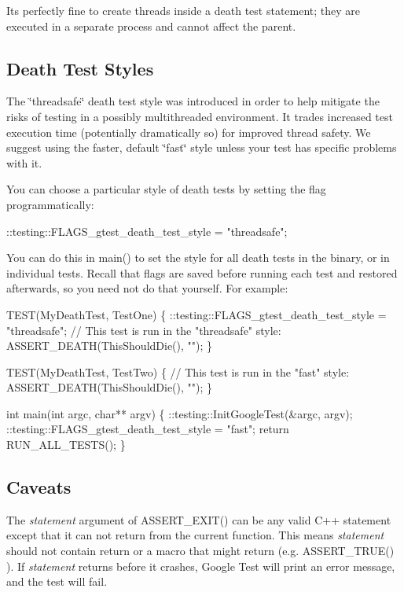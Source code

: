 It\textquotesingle{}s perfectly fine to create threads inside a death test statement; they are executed in a separate process and cannot affect the parent.

\subsection*{Death Test Styles}

The \char`\"{}threadsafe\char`\"{} death test style was introduced in order to help mitigate the risks of testing in a possibly multithreaded environment. It trades increased test execution time (potentially dramatically so) for improved thread safety. We suggest using the faster, default \char`\"{}fast\char`\"{} style unless your test has specific problems with it.

You can choose a particular style of death tests by setting the flag programmatically\+:


\begin{DoxyCode}
::testing::FLAGS\_gtest\_death\_test\_style = "threadsafe";
\end{DoxyCode}


You can do this in {\ttfamily main()} to set the style for all death tests in the binary, or in individual tests. Recall that flags are saved before running each test and restored afterwards, so you need not do that yourself. For example\+:


\begin{DoxyCode}
TEST(MyDeathTest, TestOne) \{
  ::testing::FLAGS\_gtest\_death\_test\_style = "threadsafe";
  // This test is run in the "threadsafe" style:
  ASSERT\_DEATH(ThisShouldDie(), "");
\}

TEST(MyDeathTest, TestTwo) \{
  // This test is run in the "fast" style:
  ASSERT\_DEATH(ThisShouldDie(), "");
\}

int main(int argc, char** argv) \{
  ::testing::InitGoogleTest(&argc, argv);
  ::testing::FLAGS\_gtest\_death\_test\_style = "fast";
  return RUN\_ALL\_TESTS();
\}
\end{DoxyCode}


\subsection*{Caveats}

The {\itshape statement} argument of {\ttfamily A\+S\+S\+E\+R\+T\+\_\+\+E\+X\+I\+T()} can be any valid C++ statement except that it can not return from the current function. This means {\itshape statement} should not contain {\ttfamily return} or a macro that might return (e.\+g. {\ttfamily A\+S\+S\+E\+R\+T\+\_\+\+T\+R\+U\+E()} ). If {\itshape statement} returns before it crashes, Google Test will print an error message, and the test will fail.

